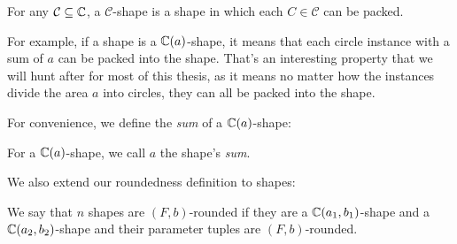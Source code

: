 \documentclass[a4paper,style=print,bibliography=totoc,nexus,lnum,extramargin]{tubsbook}
\begin{document}
\begin{definition}
    For any $\mathcal{C} \subseteq \mathbb{C}$, a $\mathcal{C}$-shape is a shape in which each $C \in \mathcal{C}$ can be packed.
\end{definition}

For example, if a shape is a $\mathbb{C}(a)$-shape, it means that each circle instance with a sum of $a$ can be packed into the shape. That's an interesting property that we will hunt after for most of this thesis, as it means no matter how the instances divide the area $a$ into circles, they can all be packed into the shape.

For convenience, we define the \emph{sum} of a $\mathbb{C}(a)$-shape:

\begin{definition}
    For a $\mathbb{C}(a)$-shape, we call $a$ the shape's \emph{sum}.
\end{definition}

We also extend our roundedness definition to shapes:

\begin{definition}
    We say that $n$ shapes are $(F,b)$-rounded if they are a $\mathbb{C}(a_1, b_1)$-shape and a $\mathbb{C}(a_2, b_2)$-shape and their parameter tuples are $(F,b)$-rounded.
\end{definition}




\end{document}
